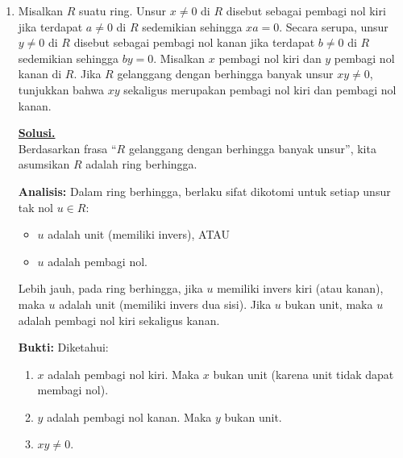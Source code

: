 \documentclass[12pt,twoside]{article}
\newenvironment{solution}
{
	\par\noindent\textbf{\underline{Solusi.}}\\
}
{
	\par
}
\begin{document}
\begin{enumerate}
\begin{solution}
\begin{itemize}
                  Maka pengandaian salah, haruslah semua nilai eigen $A$ adalah $1$.
          \end{itemize}
          Jadi nilai eigen $A$ adalah $1$ dengan multiplisitas aljabar 2.
          Polinomial karakteristiknya adalah $p(\lambda)=(\lambda-1)^2 = \lambda^2-2\lambda+1$.
          Berdasarkan Teorema Cayley-Hamilton, matriks memenuhi persamaan karakteristiknya:
          \[ (A-I)^2 = 0. \]
          Ini membuktikan bagian kedua.

          Untuk bagian pertama:
          Karena $(A-I)^2=0$ dan $A\neq I$ (jika $A=I$, $T(x)=x+b$ akan memetakan garis sejajar $b$ ke dirinya sendiri, kontradiksi), maka $\ker(A-I) = \text{Im}(A-I)$.
          Dari Syarat 1, kita tahu $b \notin \text{Im}(A-I)$.
          Karena $\text{Im}(A-I)=\ker(A-I)$, maka $b \notin \ker(A-I)$, yang berarti:
          \[ (A-I)b \neq 0 \implies Ab - b \neq 0 \implies Ab \neq b. \]
          Terbukti.
        \end{solution}
  \item Misalkan $R$ suatu ring. Unsur $x\neq 0$ di $R$ disebut sebagai pembagi nol kiri jika terdapat $a\neq 0$ di $R$ sedemikian sehingga $xa=0.$ Secara serupa, unsur $y\neq 0$ di $R$ disebut sebagai pembagi nol kanan jika terdapat $b\neq 0$ di $R$ sedemikian sehingga $by=0$. Misalkan $x$ pembagi nol kiri dan $y$ pembagi nol kanan di $R$. Jika $R$ gelanggang dengan berhingga banyak unsur $xy\neq 0$, tunjukkan bahwa $xy$ sekaligus merupakan pembagi nol kiri dan pembagi nol kanan.
        \begin{solution}
          Berdasarkan frasa ``$R$ gelanggang dengan berhingga banyak unsur'', kita asumsikan $R$ adalah ring berhingga.

          \textbf{Analisis:}
          Dalam ring berhingga, berlaku sifat dikotomi untuk setiap unsur tak nol $u \in R$:
          \begin{itemize}
            \item $u$ adalah unit (memiliki invers), ATAU
            \item $u$ adalah pembagi nol.
          \end{itemize}
          Lebih jauh, pada ring berhingga, jika $u$ memiliki invers kiri (atau kanan), maka $u$ adalah unit (memiliki invers dua sisi). Jika $u$ bukan unit, maka $u$ adalah pembagi nol kiri sekaligus kanan.

          \textbf{Bukti:}
          Diketahui:
          \begin{enumerate}
            \item $x$ adalah pembagi nol kiri. Maka $x$ bukan unit (karena unit tidak dapat membagi nol).
            \item $y$ adalah pembagi nol kanan. Maka $y$ bukan unit.
            \item $xy \neq 0$.
          \end{enumerate}


\end{solution}
\end{enumerate}
\end{document}
